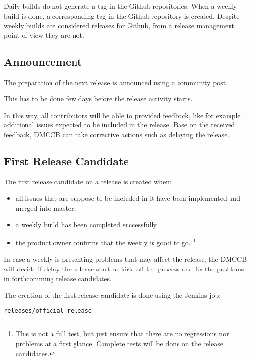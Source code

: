 Daily builds do not generate a tag in the Github repositories.
When a weekly build is done, a corresponding tag in the Github repository is created.
Despite weekly builds are considered releases for Github, from a release management point of view they are not.


\subsection{Announcement} \label{sec:anaouncement}

The preparation of the next release is announced using a community post.

This has to be done few days before the release activity starts.

In this way, all contributors will be able to provided feedback, like for example additional issues expected to be included in the release.
Base on the received feedback, DMCCB can take corrective actions such as delaying the release.


\subsection{First Release Candidate} \label{sec:firstrc}

The first release candidate on a release is created when:

\begin{itemize}
\item all issues that are suppose to be included in it have been implemented and merged into master.
\item a weekly build has been completed successfully.
\item the product owner confirms that the weekly is good to go. \footnote{This is not a full test, but just ensure that there are no regressions nor problems at a first glance. Complete tests will be done on the release candidates.}
\end{itemize}

In case a weekly is presenting problems that may affect the release, the DMCCB will decide if delay the release start or kick--off the process and fix the problems in forthcomming release candidates.

The creation of the first release candidate is done using the Jenkins job:

\begin{verbatim}
releases/official-release
\end{verbatim}

